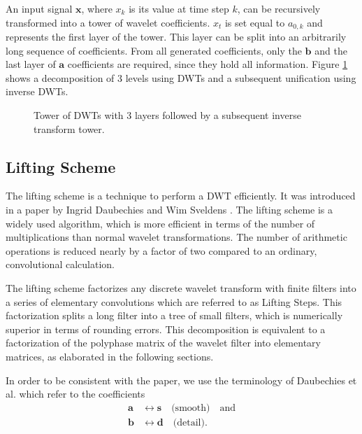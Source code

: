 \begin{refsection}
An input signal $\bm x$, where $x_k$ is its value at time step $k$, can be recursively transformed into a tower of wavelet coefficients.
$x_t$ is set equal to $a_{0,k}$ and represents the first layer of the tower.
This layer can be split into an arbitrarily long sequence of coefficients.
From all generated coefficients, only the $\bm b$ and the last layer of $\bm a$ coefficients are required, since they hold all information. %
Figure \ref{fpga:fig:dwtTower} shows a decomposition of 3 levels using DWTs and a subsequent unification using inverse DWTs.
\begin{figure}
	\centering
	
	\caption{Tower of DWTs with 3 layers followed by a subsequent inverse transform tower.}
	\label{fpga:fig:dwtTower}
\end{figure}


\subsection{Lifting Scheme}

The lifting scheme is a technique to perform a DWT efficiently.
It was introduced in a paper by Ingrid Daubechies and Wim Sveldens \cite{fpga:Daubechies1998}. 
The lifting scheme is a widely used algorithm, which is more efficient in terms of the number of multiplications than normal wavelet transformations.
The number of arithmetic operations is reduced nearly by a factor of two compared to an ordinary, convolutional calculation.

The lifting scheme factorizes any discrete wavelet transform with finite filters into a series of elementary convolutions which are referred to as Lifting Steps.
This factorization splits a long filter into a tree of small filters, which is numerically superior in terms of rounding errors.
This decomposition is equivalent to a factorization of the polyphase matrix of the wavelet filter into elementary matrices, as elaborated in the following sections. %

In order to be consistent with the paper, we use the terminology of Daubechies et al. which refer to the coefficients
\begin{align}
\bm a & \leftrightarrow \bm s \quad \text{(smooth)} \quad \text{and} \\
\bm b & \leftrightarrow \bm d \quad \text{(detail)} .
\end{align}


\end{refsection}
